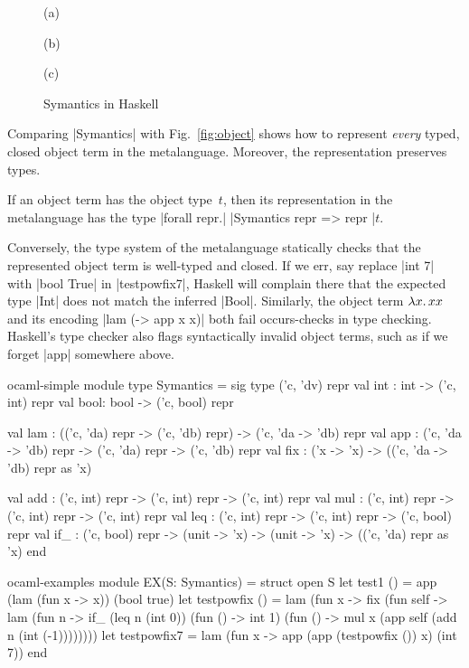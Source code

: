 \ifshort
\begin{figure}
(a) 

(b) 

(c) 
\caption{Symantics in Haskell}
\label{fig:symantics-haskell}
\end{figure}
\fi

Comparing |Symantics| with Fig.~\ref{fig:object}
shows how to represent \emph{every} typed, closed object term in the
metalanguage. Moreover, the representation preserves types.
\begin{proposition}
If an object term has the object type~$t$, then its
representation in the metalanguage has the type 
|forall repr.| |Symantics repr => repr |$t$.
\end{proposition}
Conversely, the type system of the metalanguage statically checks that the
represented object term is well-typed and closed.
If we err, say replace |int 7| with |bool True| in
|testpowfix7|, Haskell will complain there that the expected type |Int| does not
match the inferred |Bool|.  Similarly, the object term $\mathopen{\lambda\mathord{x}.\,}xx$ and its
encoding |lam (\x -> app x x)| both fail occurs-checks in type checking.
Haskell's type checker also flags syntactically invalid object terms, 
such as if we forget |app| somewhere above.

\begin{SaveVerbatim}{ocaml-simple}
module type Symantics = sig type ('c, 'dv) repr
  val int : int  -> ('c, int) repr
  val bool: bool -> ('c, bool) repr

  val lam : (('c, 'da) repr -> ('c, 'db) repr) -> ('c, 'da -> 'db) repr
  val app : ('c, 'da -> 'db) repr -> ('c, 'da) repr -> ('c, 'db) repr
  val fix : ('x -> 'x) -> (('c, 'da -> 'db) repr as 'x)

  val add : ('c, int) repr -> ('c, int) repr -> ('c, int) repr
  val mul : ('c, int) repr -> ('c, int) repr -> ('c, int) repr
  val leq : ('c, int) repr -> ('c, int) repr -> ('c, bool) repr
  val if_ : ('c, bool) repr
            -> (unit -> 'x) -> (unit -> 'x) -> (('c, 'da) repr as 'x)
end
\end{SaveVerbatim}
\begin{SaveVerbatim}{ocaml-examples}
module EX(S: Symantics) = struct open S
  let test1 () = app (lam (fun x -> x)) (bool true)
  let testpowfix () =
       lam (fun x -> fix (fun self -> lam (fun n ->
        if_ (leq n (int 0)) (fun () -> int 1)
            (fun () -> mul x (app self (add n (int (-1))))))))
  let testpowfix7 = lam (fun x -> app (app (testpowfix ()) x) (int 7))
end
\end{SaveVerbatim}

